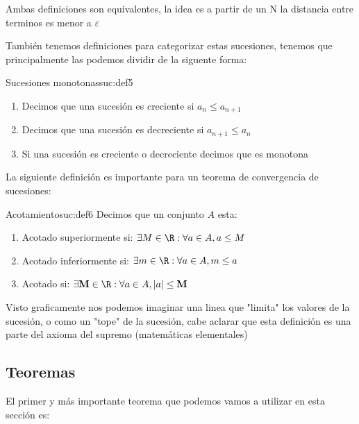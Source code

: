 \begin{nota}
    Ambas definiciones son equivalentes, la idea es a partir de un N la distancia entre terminos es menor a $\varepsilon$
\end{nota}

También tenemos definiciones para categorizar estas sucesiones, tenemos que principalmente las podemos dividir de la siguente forma:

\begin{definicion}{Sucesiones monotonas}{suc:def5}
    \begin{enumerate}
        \item Decimos que una sucesión es creciente si $a_n \leq a_{n + 1}$
        \item Decimos que una sucesión es decreciente si $a_{n + 1} \leq {a_n}$
        \item Si una sucesión es creciente o decreciente decimos que es monotona
    \end{enumerate}
\end{definicion}

La siguiente definición es importante para un teorema de convergencia de sucesiones:

\begin{definicion}{Acotamiento}{suc:def6}
    Decimos que un conjunto $A$ esta:
    \begin{enumerate}
        \item Acotado superiormente si: $\exists M \in \R: \forall a \in A, a \leq M$
        \item Acotado inferiormente si: $\exists m \in \R: \forall a \in A, m \leq a$
        \item Acotado si: $\exists \mathbf{M} \in \R: \forall a \in A, |a| \leq \mathbf{M}$
    \end{enumerate}
\end{definicion}

\begin{nota}
    Visto graficamente nos podemos imaginar una linea que "limita" los valores de la sucesión, o como un "tope" de la sucesión, cabe aclarar que esta definición es una parte del axioma del supremo (matemáticas elementales)
\end{nota}

\subsection{Teoremas}

El primer y más importante teorema que podemos vamos a utilizar en esta sección es:

